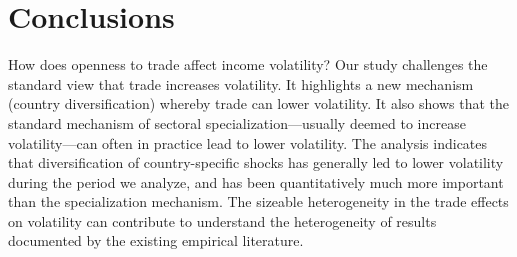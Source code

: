 \documentclass[12pt]{article}
\begin{document}
\section{Conclusions}

How does openness to trade affect income volatility? Our study challenges
the standard view that trade increases volatility. It highlights a new
mechanism (country diversification) whereby trade can lower volatility. It
also shows that the standard mechanism of sectoral specialization---usually
deemed to increase volatility---can often in practice lead to lower
volatility. The analysis indicates that diversification of country-specific
shocks has generally led to lower volatility during the period we analyze,
and has been quantitatively much more important than the specialization
mechanism. The sizeable heterogeneity in the trade effects on volatility can
contribute to understand the heterogeneity of results documented by the
existing empirical literature.
\end{document}
